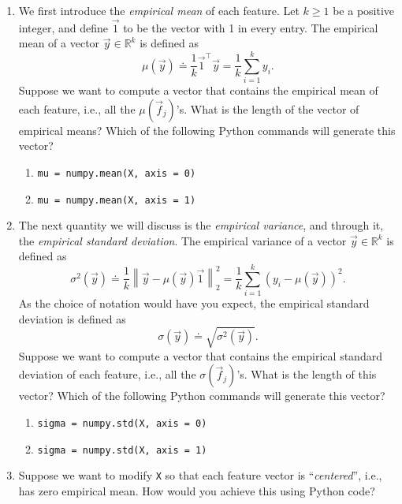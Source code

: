 \documentclass[10pt]{article}
\theoremstyle{definition}
\theoremstyle{plain}
\newcommand{\RR}{\mathbb{R}}
\begin{document}
\begin{enumerate}[label=(\alph*)]
\item We first introduce the \textit{empirical mean} of each feature. Let $k \geq 1$ be a positive integer, and define $\vec{1}$ to be the vector with 1 in every entry. The empirical mean of a vector $\vec{y} \in \RR^k$ is defined as
\begin{equation}
\mu(\vec{y}) \doteq \frac{1}{k} \vec{1}^\top \vec{y} = \frac{1}{k} \sum_{i=1}^{k} y_i.
\end{equation}
Suppose we want to compute a vector that contains the empirical mean of each feature, i.e., all the $\mu(\vec{f}_j)$'s. What is the length of the vector of empirical means? Which of the following Python commands will generate this vector?
\begin{enumerate}[label=\roman*.]
\item \texttt{mu = numpy.mean(X, axis = 0)}
\item \texttt{mu = numpy.mean(X, axis = 1)}
\end{enumerate}

\item The next quantity we will discuss is the \textit{empirical variance}, and through it, the \textit{empirical standard deviation}. The empirical variance of a vector $\vec{y} \in \RR^k$ is defined as
\begin{equation}
\sigma^2(\vec{y}) \doteq \frac{1}{k} \left\| \vec{y} - \mu(\vec{y})\vec{1} \right\|_2^2 = \frac{1}{k} \sum_{i=1}^{k} (y_i - \mu(\vec{y}))^2.
\end{equation}
As the choice of notation would have you expect, the empirical standard deviation is defined as
\begin{equation}
\sigma(\vec{y}) \doteq \sqrt{\sigma^2(\vec{y})}.
\end{equation}
Suppose we want to compute a vector that contains the empirical standard deviation of each feature, i.e., all the $\sigma(\vec{f}_j)$'s. What is the length of this vector? Which of the following Python commands will generate this vector?
\begin{enumerate}[label=\roman*.]
\item \texttt{sigma = numpy.std(X, axis = 0)}
\item \texttt{sigma = numpy.std(X, axis = 1)}
\end{enumerate}

\item Suppose we want to modify \texttt{X} so that each feature vector is ``\textit{centered}'', i.e., has zero empirical mean. How would you achieve this using Python code?


\end{enumerate}
\end{document}
